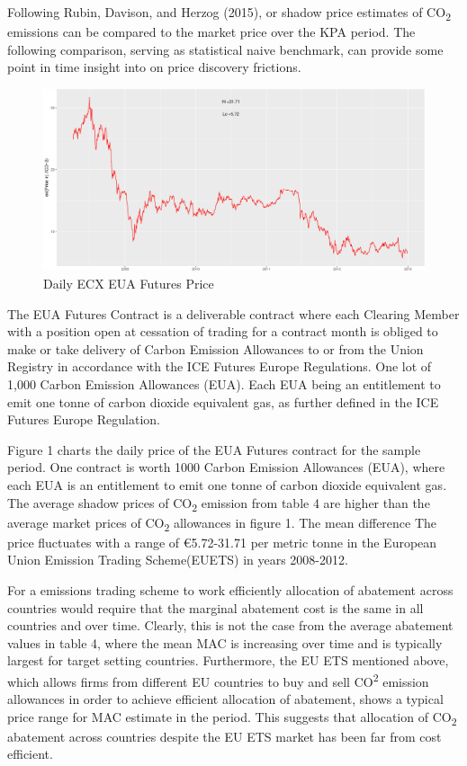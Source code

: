 \documentclass[
  10pt,
]{article}
\begin{document}
Following Rubin, Davison, and Herzog (2015), or shadow price estimates
of CO\textsubscript{2} emissions can be compared to the market price
over the KPA period. The following comparison, serving as statistical
naive benchmark, can provide some point in time insight into on price
discovery frictions.

\begin{figure}[H]
\includegraphics{figures/paper-ETSprice-1} \caption{Daily ECX EUA Futures Price}\label{fig:ETSprice}
\end{figure}

\begin{footnotesize} The EUA Futures Contract is a deliverable contract where each Clearing Member with a position open at cessation of trading for a contract month is obliged to make or take delivery of Carbon Emission Allowances to or from the Union Registry in accordance with the ICE Futures Europe Regulations. One lot of 1,000 Carbon Emission Allowances (EUA). Each EUA being an entitlement to emit one tonne of carbon dioxide equivalent gas, as further defined in the ICE Futures Europe Regulation.
\end{footnotesize}

Figure 1 charts the daily price of the EUA Futures contract for the
sample period. One contract is worth 1000 Carbon Emission Allowances
(EUA), where each EUA is an entitlement to emit one tonne of carbon
dioxide equivalent gas. The average shadow prices of CO\textsubscript{2}
emission from table 4 are higher than the average market prices of
CO\textsubscript{2} allowances in figure 1. The mean difference The
price fluctuates with a range of €5.72-31.71 per metric tonne in the
European Union Emission Trading Scheme(EUETS) in years 2008-2012.

For a emissions trading scheme to work efficiently allocation of
abatement across countries would require that the marginal abatement
cost is the same in all countries and over time. Clearly, this is not
the case from the average abatement values in table 4, where the mean
MAC is increasing over time and is typically largest for target setting
countries. Furthermore, the EU ETS mentioned above, which allows firms
from different EU countries to buy and sell CO\textsuperscript{2}
emission allowances in order to achieve efficient allocation of
abatement, shows a typical price range for MAC estimate in the period.
This suggests that allocation of CO\textsubscript{2} abatement across
countries despite the EU ETS market has been far from cost efficient.
\end{document}
